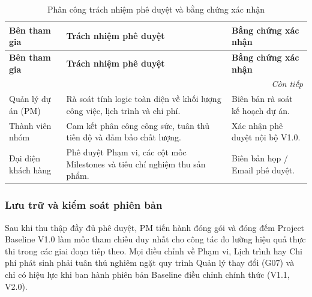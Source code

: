 \begingroup\small
\setlength{\tabcolsep}{4pt}\renewcommand{\arraystretch}{1.15}
\begin{longtable}{@{}p{.20\linewidth}p{.42\linewidth}p{.30\linewidth}@{}}
\caption{Phân công trách nhiệm phê duyệt và bằng chứng xác nhận}\label{tab:agreement}\\
\toprule
\textbf{Bên tham gia} & \textbf{Trách nhiệm phê duyệt} & \textbf{Bằng chứng xác nhận} \\
\midrule\endfirsthead
\toprule
\textbf{Bên tham gia} & \textbf{Trách nhiệm phê duyệt} & \textbf{Bằng chứng xác nhận} \\
\midrule\endhead
\midrule\multicolumn{3}{r}{\textit{Còn tiếp}}\\\endfoot
\bottomrule\endlastfoot
Quản lý dự án (PM) & Rà soát tính logic toàn diện về khối lượng công việc, lịch trình và chi phí. & Biên bản rà soát kế hoạch dự án. \\
Thành viên nhóm & Cam kết phân công công sức, tuân thủ tiến độ và đảm bảo chất lượng. & Xác nhận phê duyệt nội bộ V1.0. \\
Đại diện khách hàng & Phê duyệt Phạm vi, các cột mốc Milestones và tiêu chí nghiệm thu sản phẩm. & Biên bản họp / Email phê duyệt. \\
\end{longtable}\endgroup

\subsubsection{Lưu trữ và kiểm soát phiên bản}
\enlargethispage{3\baselineskip}

Sau khi thu thập đầy đủ phê duyệt, PM tiến hành đóng gói và đóng đếm Project Baseline V1.0 làm mốc tham chiếu duy nhất cho công tác đo lường hiệu quả thực thi trong các giai đoạn tiếp theo. Mọi điều chỉnh về Phạm vi, Lịch trình hay Chi phí phát sinh phải tuân thủ nghiêm ngặt quy trình Quản lý thay đổi (G07) và chỉ có hiệu lực khi ban hành phiên bản Baseline điều chỉnh chính thức (V1.1, V2.0).
